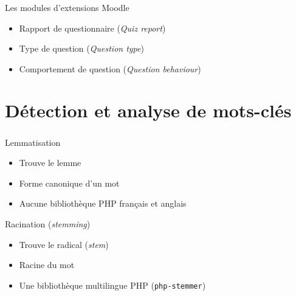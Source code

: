 \documentclass{beamer}
\begin{document}
  \begin{frame}
    \frametitle{\insertsection}
    \begin{block}{Les modules d'extensions Moodle}
      \begin{itemize}
        \item Rapport de questionnaire (\textit{Quiz report})
        \item Type de question (\textit{Question type})
        \item Comportement de question (\textit{Question behaviour})
      \end{itemize}
    \end{block}
  \end{frame}
  
  \section[Mots-cl\'es]{D\'etection et analyse de mots-cl\'es}
  \begin{frame}
    \frametitle{\insertsection}
    \begin{block}{Lemmatisation}
      \begin{itemize}
        \item Trouve le lemme
        \item Forme canonique d'un mot
        \item Aucune biblioth\`eque PHP fran\c{c}ais et anglais
      \end{itemize}
    \end{block}
  
    \vfill
  
    \begin{block}{Racination (\textit{stemming})}
      \begin{itemize}
        \item Trouve le radical (\textit{stem})
        \item Racine du mot
        \item Une biblioth\`eque multilingue PHP (\texttt{php-stemmer})
      \end{itemize}
    \end{block}
    \vfill
  \end{frame}
  
\end{document}
